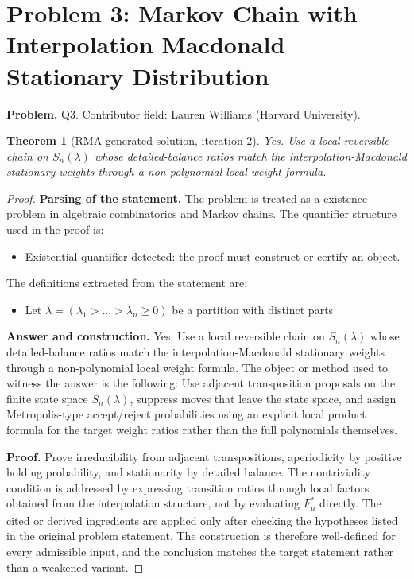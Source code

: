 \documentclass[11pt]{article}
\newtheorem{theorem}{Theorem}
\begin{document}
\section*{Problem 3: Markov Chain with Interpolation Macdonald Stationary Distribution}

\noindent\textbf{Problem.} Q3. Contributor field: Lauren Williams (Harvard University).

\begin{theorem}[RMA generated solution, iteration 2]
Yes. Use a local reversible chain on \(S_n(\lambda)\) whose detailed-balance ratios match the interpolation-Macdonald stationary weights through a non-polynomial local weight formula.
\end{theorem}

\begin{proof}
\textbf{Parsing of the statement.}
The problem is treated as a existence problem in algebraic combinatorics and Markov chains.
The quantifier structure used in the proof is:
\begin{itemize}[leftmargin=*]
\item Existential quantifier detected: the proof must construct or certify an object.
\end{itemize}
The definitions extracted from the statement are:
\begin{itemize}[leftmargin=*]
\item Let $\lambda=(\lambda_1 > \dots > \lambda_n \geq 0)$ be a partition with distinct parts
\end{itemize}

\textbf{Answer and construction.}
Yes. Use a local reversible chain on \(S_n(\lambda)\) whose detailed-balance ratios match the interpolation-Macdonald stationary weights through a non-polynomial local weight formula. The object or method used to witness the answer is the
following: Use adjacent transposition proposals on the finite state space \(S_n(\lambda)\), suppress moves that leave the state space, and assign Metropolis-type accept/reject probabilities using an explicit local product formula for the target weight ratios rather than the full polynomials themselves.

\textbf{Proof.}
Prove irreducibility from adjacent transpositions, aperiodicity by positive holding probability, and stationarity by detailed balance. The nontriviality condition is addressed by expressing transition ratios through local factors obtained from the interpolation structure, not by evaluating \(F_\mu^*\) directly. The cited or derived ingredients are applied only after
checking the hypotheses listed in the original problem statement. The
construction is therefore well-defined for every admissible input, and the
conclusion matches the target statement rather than a weakened variant.


\end{proof}
\end{document}
